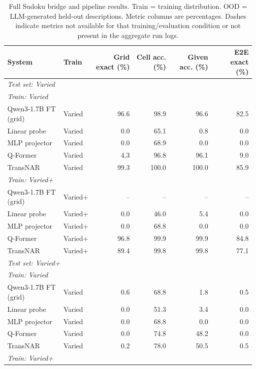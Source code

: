 \documentclass[11pt]{article}
\begin{document}
\begin{table}[t]
\centering
\tiny
\setlength{\tabcolsep}{3pt}
\renewcommand{\arraystretch}{0.82}
\caption{Full Sudoku bridge and pipeline results. Train = training distribution. OOD = LLM-generated held-out descriptions. Metric columns are percentages. Dashes indicate metrics not available for that training/evaluation condition or not present in the aggregate run logs.}
\label{tab:app_bridge_full}
\begin{tabular}{llrrrr}
\toprule
System & Train & Grid exact (\%) & Cell acc. (\%) & Given acc. (\%) & E2E exact (\%) \\
\midrule
\multicolumn{6}{l}{\textit{Test set: Varied}} \\
\midrule
\multicolumn{6}{l}{\textit{Train: Varied}} \\
Qwen3-1.7B FT (grid) & Varied  & 96.6 & 98.9 & 96.6 & 82.5 \\
Linear probe  & Varied  & 0.0 & 65.1 & 0.8 & 0.0 \\
MLP projector & Varied  & 0.0 & 68.9 & 0.0 & 0.0 \\
Q-Former      & Varied  & 4.3 & 96.8 & 96.1 & 9.0 \\
TransNAR      & Varied  & 99.3 & 100.0 & 100.0 & 85.9 \\
\multicolumn{6}{l}{\textit{Train: Varied+}} \\
Qwen3-1.7B FT (grid) & Varied+ & -- & -- & -- & -- \\
Linear probe  & Varied+ & 0.0 & 46.0 & 5.4 & 0.0 \\
MLP projector & Varied+ & 0.0 & 68.8 & 0.0 & 0.0 \\
Q-Former      & Varied+ & 96.8 & 99.9 & 99.9 & 84.8 \\
TransNAR      & Varied+ & 89.4 & 99.8 & 99.8 & 77.1 \\
\midrule
\multicolumn{6}{l}{\textit{Test set: Varied+}} \\
\midrule
\multicolumn{6}{l}{\textit{Train: Varied}} \\
Qwen3-1.7B FT (grid) & Varied  & 0.6 & 68.8 & 1.8 & 0.5 \\
Linear probe  & Varied  & 0.0 & 51.3 & 3.4 & 0.0 \\
MLP projector & Varied  & 0.0 & 68.8 & 0.0 & 0.0 \\
Q-Former      & Varied  & 0.0 & 74.8 & 48.2 & 0.0 \\
TransNAR      & Varied  & 0.2 & 78.0 & 50.5 & 0.5 \\
\multicolumn{6}{l}{\textit{Train: Varied+}} \\

\end{tabular}
\end{table}
\end{document}
